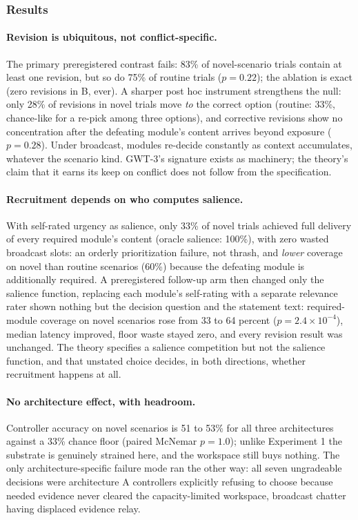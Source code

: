 \documentclass[11pt]{article}
\begin{document}
\subsubsection{Results}

\paragraph{Revision is ubiquitous, not conflict-specific.} The primary
preregistered contrast fails: 83\% of novel-scenario trials contain at least
one revision, but so do 75\% of routine trials ($p=0.22$); the ablation is
exact (zero revisions in B, ever). A sharper post hoc instrument strengthens
the null: only 28\% of revisions in novel trials move \emph{to} the correct
option (routine: 33\%, chance-like for a re-pick among three options), and
corrective revisions show no concentration after the defeating module's content
arrives beyond exposure ($p=0.28$). Under broadcast, modules re-decide
constantly as context accumulates, whatever the scenario kind. GWT-3's
signature exists as machinery; the theory's claim that it earns its keep on
conflict does not follow from the specification.

\paragraph{Recruitment depends on who computes salience.} With self-rated
urgency as salience, only 33\% of novel trials achieved full delivery of every
required module's content (oracle salience: 100\%), with zero wasted broadcast
slots: an orderly prioritization failure, not thrash, and \emph{lower} coverage
on novel than routine scenarios (60\%) because the defeating module is
additionally required. A preregistered follow-up arm then changed only the
salience function, replacing each module's self-rating with a separate
relevance rater shown nothing but the decision question and the statement
text: required-module coverage on novel scenarios rose from 33 to 64 percent
($p=2.4\times10^{-4}$), median latency improved, floor waste stayed zero, and
every revision result was unchanged. The theory specifies a salience
competition but not the salience function, and that unstated choice decides,
in both directions, whether recruitment happens at all.

\paragraph{No architecture effect, with headroom.} Controller accuracy on
novel scenarios is 51 to 53\% for all three architectures against a 33\%
chance floor (paired McNemar $p=1.0$); unlike Experiment 1 the substrate is
genuinely strained here, and the workspace still buys nothing. The only
architecture-specific failure mode ran the other way: all seven ungradeable
decisions were architecture A controllers explicitly refusing to choose
because needed evidence never cleared the capacity-limited workspace,
broadcast chatter having displaced evidence relay.
\end{document}
